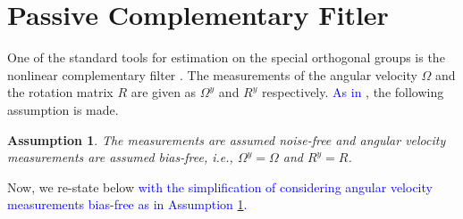\documentclass{article}
\newcommand{\Omegay}{\Omega^y}
\newtheorem{assumption}{Assumption}
\newtheorem{definition}{Definition}
\newcommand{\textblue}[1]{\textcolor{blue}{#1}}
\begin{document}

\section{Passive Complementary Fitler}

One of the standard tools for estimation on the special orthogonal groups is the nonlinear complementary filter \cite{mahony_complementaryFilter}. The measurements of the angular velocity $\Omega$ and the rotation matrix $R$ are given as $\Omegay$ and $R^y$ respectively. \textblue{As in \cite{mahony_complementaryFilter}}, the following assumption is made. 
\begin{assumption} \label{ass:no_meas_noise}
    The measurements are assumed noise-free and angular velocity measurements are assumed bias-free, i.e., {$\Omegay=\Omega$ and $R^y = R$.}
\end{assumption}

Now, we re-state below \textblue{{\cite[Theorem 4.2]{mahony_complementaryFilter}}} \textblue{with the simplification of considering angular velocity measurements bias-free as in Assumption \ref{ass:no_meas_noise}.}
\end{document}
